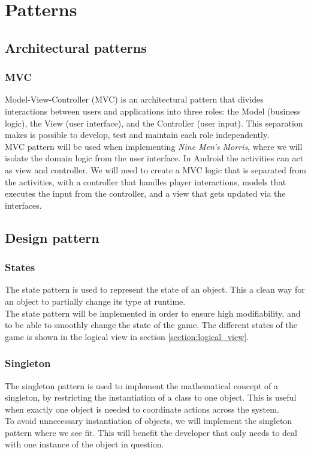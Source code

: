 \section{Patterns}

\subsection{Architectural patterns}

\subsubsection{MVC}
Model-View-Controller (MVC) is an architectural pattern that divides interactions between users and applications into three roles: the Model (business logic), the View (user interface), and the Controller (user input). This separation makes is possible to develop, test and maintain each role independently. \\

MVC pattern will be used when implementing \emph{Nine Men’s Morris}, where we will isolate the domain logic from the user interface. In Android the activities can act as view and controller. We will need to create a MVC logic that is separated from the activities, with a controller that handles player interactions, models that executes the input from the controller, and a view that gets updated via the interfaces.

\subsection{Design pattern}
\subsubsection{States}
The state pattern is used to represent the state of an object. This a clean way for an object to partially change its type at runtime. \\

The state pattern will be implemented in order to ensure high modifiability, and to be able to smoothly change the state of the game. The different states of the game is shown in the logical view in section \ref{section:logical_view}.

\subsubsection{Singleton}
The singleton pattern is used to implement the mathematical concept of a singleton, by restricting the instantiation of a class to one object. This is useful when exactly one object is needed to coordinate actions across the system. \\

To avoid unnecessary instantiation of objects, we will implement the singleton pattern where we see fit. This will benefit the developer that only needs to deal with one instance of the object in question.




